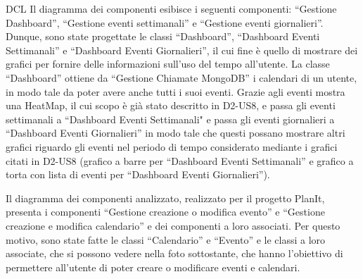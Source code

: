 \begin{listaPersonale}{DCL}
    Il diagramma dei componenti esibisce i seguenti componenti: “Gestione Dashboard”, “Gestione eventi settimanali” e “Gestione eventi giornalieri”. Dunque, sono state progettate le classi “Dashboard”, “Dashboard Eventi Settimanali” e “Dashboard Eventi Giornalieri”, il cui fine è quello di mostrare dei grafici per fornire delle informazioni sull'uso del tempo all'utente.
    La classe “Dashboard” ottiene da “Gestione Chiamate MongoDB” i calendari di un utente, in modo tale da poter avere anche tutti i suoi eventi. Grazie agli eventi mostra una HeatMap, il cui scopo è già stato descritto in D2-US8, e passa gli eventi settimanali a “Dashboard Eventi Settimanali" e passa gli eventi giornalieri a “Dashboard Eventi Giornalieri” in modo tale che questi possano mostrare altri grafici riguardo gli eventi nel periodo di tempo considerato mediante i grafici citati in D2-US8 (grafico a barre per “Dashboard Eventi Settimanali” e grafico a torta con lista di eventi per “Dashboard Eventi Giornalieri”).
    \begin{comment}
        \begin{center}
            \\
            \blfootnote{Immagine \href{https://github.com/Life-planner/Documentazione/blob/main/D3/img/Diagrammi/png/path/to/img.png}{PNG}/\href{https://github.com/Life-planner/Documentazione/blob/main/D3/img/Diagrammi/svg/path/to/img.svg}{SVG} nome file}
        \end{center}
    \end{comment}



    Il diagramma dei componenti analizzato, realizzato per il progetto PlanIt, presenta i componenti “Gestione creazione o modifica evento” e “Gestione creazione e modifica calendario” e dei componenti a loro associati. Per questo motivo, sono state fatte le classi “Calendario” e “Evento” e le classi a loro associate, che si possono vedere nella foto sottostante, che hanno l'obiettivo di permettere all'utente di poter creare o modificare eventi e calendari.
    \begin{comment}
        \begin{center}
            \\
            \blfootnote{Immagine \href{https://github.com/Life-planner/Documentazione/blob/main/D3/img/Diagrammi/png/path/to/img.png}{PNG}/\href{https://github.com/Life-planner/Documentazione/blob/main/D3/img/Diagrammi/svg/path/to/img.svg}{SVG} nome file}
        \end{center}
    \end{comment}



\end{listaPersonale}
